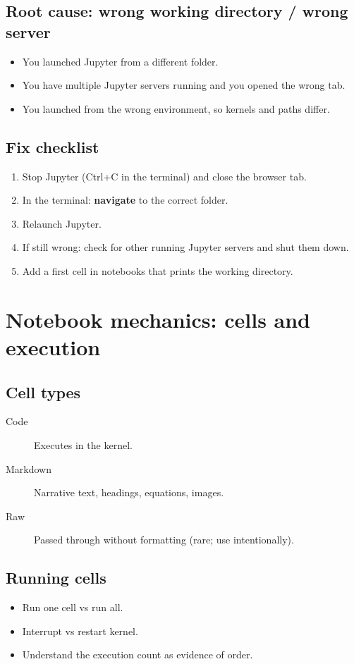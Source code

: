\subsection{Root cause: wrong working directory / wrong server}
\begin{itemize}
\item You launched Jupyter from a different folder.
\item You have multiple Jupyter servers running and you opened the wrong tab.
\item You launched from the wrong environment, so kernels and paths differ.
\end{itemize}

\subsection{Fix checklist}
\begin{enumerate}
\item Stop Jupyter (Ctrl+C in the terminal) and close the browser tab.
\item In the terminal: \textbf{navigate} to the correct folder.
\item Relaunch Jupyter.
\item If still wrong: check for other running Jupyter servers and shut them down.
\item Add a first cell in notebooks that prints the working directory.
\end{enumerate}

\section{Notebook mechanics: cells and execution}
\subsection{Cell types}
\begin{description}
\item[Code] Executes in the kernel.
\item[Markdown] Narrative text, headings, equations, images.
\item[Raw] Passed through without formatting (rare; use intentionally).
\end{description}

\subsection{Running cells}
\begin{itemize}
\item Run one cell vs run all.
\item Interrupt vs restart kernel.
\item Understand the execution count as evidence of order.
\end{itemize}

